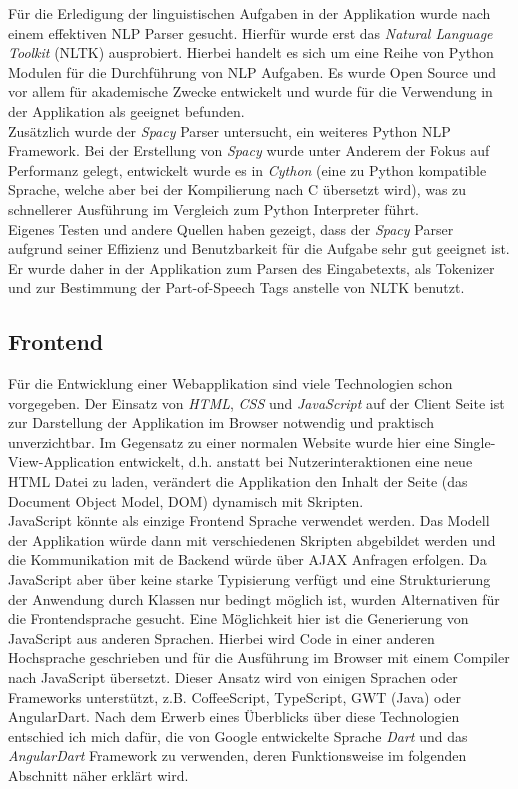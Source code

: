 Für die Erledigung der linguistischen Aufgaben in der Applikation wurde nach einem effektiven NLP Parser gesucht. Hierfür wurde erst das \textit{Natural Language Toolkit} (NLTK)\cite{Bird2004a} ausprobiert. Hierbei handelt es sich um eine Reihe von Python Modulen für die Durchführung von NLP Aufgaben. Es wurde Open Source und vor allem für akademische Zwecke entwickelt und wurde für die Verwendung in der Applikation als geeignet befunden.\\
Zusätzlich wurde der \textit{Spacy} Parser untersucht, ein weiteres Python NLP Framework. Bei der Erstellung von \textit{Spacy} wurde unter Anderem der Fokus auf Performanz gelegt, entwickelt wurde es in \textit{Cython} (eine zu Python kompatible Sprache, welche aber bei der Kompilierung nach C übersetzt wird), was zu schnellerer Ausführung im Vergleich zum Python Interpreter führt.\\
Eigenes Testen und andere Quellen haben gezeigt, dass der \textit{Spacy} Parser aufgrund seiner Effizienz\cite{Stent2015} und Benutzbarkeit für die Aufgabe sehr gut geeignet ist. Er wurde daher in der Applikation zum Parsen des Eingabetexts, als Tokenizer und zur Bestimmung der Part-of-Speech Tags anstelle von NLTK benutzt.

\subsection{Frontend}

Für die Entwicklung einer Webapplikation sind viele Technologien schon vorgegeben. Der Einsatz von \textit{HTML}, \textit{CSS} und \textit{JavaScript} auf der Client Seite ist zur Darstellung der Applikation im Browser notwendig und praktisch unverzichtbar. Im Gegensatz zu einer normalen Website wurde hier eine Single-View-Application entwickelt, d.h. anstatt bei Nutzerinteraktionen eine neue HTML Datei zu laden, verändert die Applikation den Inhalt der Seite (das Document Object Model, DOM) dynamisch mit Skripten\cite{mikowski2013single}.\\

JavaScript könnte als einzige Frontend Sprache verwendet werden. Das Modell der Applikation würde dann mit verschiedenen Skripten abgebildet werden und die Kommunikation mit de Backend würde über AJAX Anfragen erfolgen. Da JavaScript aber über keine starke Typisierung verfügt und eine Strukturierung der Anwendung durch Klassen nur bedingt möglich ist, wurden Alternativen für die Frontendsprache gesucht. Eine Möglichkeit hier ist die Generierung von JavaScript aus anderen Sprachen. Hierbei wird Code in einer anderen Hochsprache geschrieben und für die Ausführung im Browser mit einem Compiler nach JavaScript übersetzt. Dieser Ansatz wird von einigen Sprachen oder Frameworks unterstützt, z.B. CoffeeScript, TypeScript, GWT (Java) oder AngularDart. Nach dem Erwerb eines Überblicks über diese Technologien entschied ich mich dafür, die von Google entwickelte Sprache \textit{Dart} und das \textit{AngularDart} Framework zu verwenden, deren Funktionsweise im folgenden Abschnitt näher erklärt wird.

